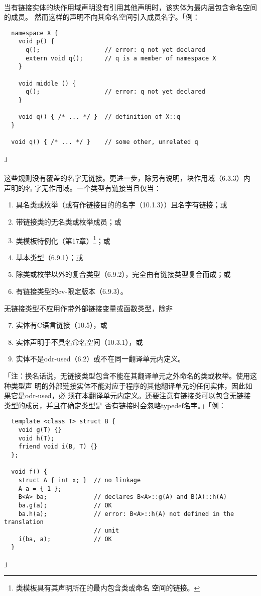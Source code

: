 \paragraph{}
当有链接实体的块作用域声明没有引用其他声明时，该实体为最内层包含命名空间的成员。
然而这样的声明不向其命名空间引入成员名字。「例：
\begin{lstlisting}
  namespace X {
    void p() {
      q();                  // error: q not yet declared
      extern void q();      // q is a member of namespace X
    }

    void middle () {
      q();                  // error: q not yet declared
    }

    void q() { /* ... */ }  // definition of X::q
  }

  void q() { /* ... */ }    // some other, unrelated q
\end{lstlisting}」

\paragraph{}
这些规则没有覆盖的名字无链接。更进一步，除另有说明，块作用域（6.3.3）内声明的名
字无作用域。一个类型有链接当且仅当：
\begin{enumerate}
  \item{具名类或枚举（或有作链接目的的名字（10.1.3））且名字有链接；或}
  \item{带链接类的无名类或枚举成员；或}
  \item{类模板特例化（第17章）\footnote{类模板具有其声明所在的最内包含类或命名
    空间的链接。}；或}
  \item{基本类型（6.9.1）；或}
  \item{除类或枚举以外的复合类型（6.9.2），完全由有链接类型复合而成；或}
  \item{有链接类型的cv-限定版本（6.9.3）。}
\end{enumerate}
无链接类型不应用作带外部链接变量或函数类型，除非
\begin{enumerate}
  \setcounter{enumi}{6}
  \item{实体有C语言链接（10.5），或}
  \item{实体声明于不具名命名空间（10.3.1），或}
  \item{实体不是odr-used（6.2）或不在同一翻译单元内定义。}
\end{enumerate}
「注：换名话说，无链接类型包含不能在其翻译单元之外命名的类或枚举。使用这种类型声
明的外部链接实体不能对应于程序的其他翻译单元的任何实体，因此如果它是odr-used，必
须在本翻译单元内定义。还要注意有链接类可以包含无链接类型的成员，并且在确定类型是
否有链接时会忽略typedef名字。」「例：
\begin{lstlisting}
  template <class T> struct B {
    void g(T) {}
    void h(T);
    friend void i(B, T) {}
  };

  void f() {
    struct A { int x; }  // no linkage
    A a = { 1 };
    B<A> ba;             // declares B<A>::g(A) and B(A)::h(A)
    ba.g(a);             // OK
    ba.h(a);             // error: B<A>::h(A) not defined in the translation
                         // unit
    i(ba, a);            // OK
  }
\end{lstlisting}」

